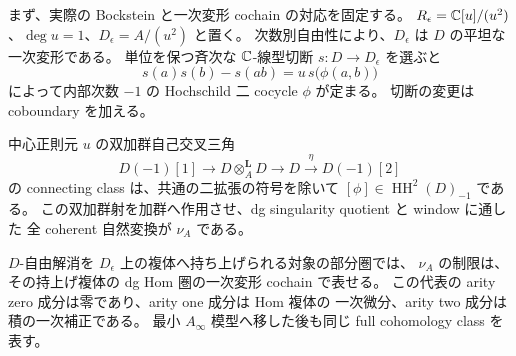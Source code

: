 まず、実際の Bockstein と一次変形 cochain の対応を固定する。
$R_\epsilon=\mathbb C[u]/(u^2)$、$\deg u=1$、$D_\epsilon=A/(u^2)$ と置く。
次数別自由性により、$D_\epsilon$ は $D$ の平坦な一次変形である。
単位を保つ斉次な $\mathbb C$-線型切断 $s:D\to D_\epsilon$ を選ぶと
\[
 s(a)s(b)-s(ab)=u\,s\bigl(\phi(a,b)\bigr)
\]
によって内部次数 $-1$ の Hochschild 二 cocycle $\phi$ が定まる。
切断の変更は coboundary を加える。

\begin{lemma}
\label{mix:lem:linear-bockstein-characteristic}
中心正則元 $u$ の双加群自己交叉三角
\begin{equation}\label{mix:eq:linear-bockstein-self-intersection}
 D(-1)[1]\longrightarrow D\otimes_A^{\mathbf L}D
 \longrightarrow D\xrightarrow{\eta}D(-1)[2]
\end{equation}
の connecting class は、共通の二拡張の符号を除いて
$[\phi]\in\operatorname{HH}^2(D)_{-1}$ である。
この双加群射を加群へ作用させ、dg singularity quotient と window に通した
全 coherent 自然変換が $\nu_A$ である。

$D$-自由解消を $D_\epsilon$ 上の複体へ持ち上げられる対象の部分圏では、
$\nu_A$ の制限は、その持上げ複体の dg Hom 圏の一次変形 cochain で表せる。
この代表の arity zero 成分は零であり、arity one 成分は Hom 複体の
一次微分、arity two 成分は積の一次補正である。
最小 $A_\infty$ 模型へ移した後も同じ full cohomology class を表す。
\end{lemma}

